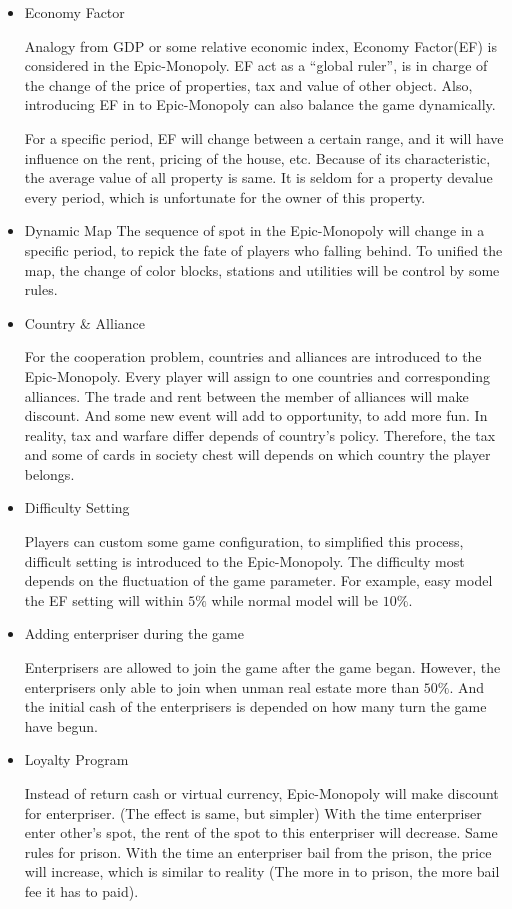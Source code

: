 \documentclass[a4paper,12pt]{article}
\begin{document}
\begin{itemize}
	\item Economy Factor
	
	Analogy from GDP or some relative economic index, Economy Factor(EF) is considered in the Epic-Monopoly. EF act as a “global ruler”, is in charge of the change of the price of properties, tax and value of other object. Also, introducing EF in to Epic-Monopoly can also balance the game dynamically.
	
	For a specific period, EF will change between a certain range, and it will have influence on the rent, pricing of the house, etc. Because of its characteristic, the average value of all property is same. It is seldom for a property devalue every period, which is unfortunate for the owner of this property.
	
	\item Dynamic Map
	The sequence of spot in the Epic-Monopoly will change in a specific period, to repick the fate of players who falling behind. To unified the map, the change of color blocks, stations and utilities will be control by some rules.
	
	\item Country \& Alliance
	
	For the cooperation problem, countries and alliances are introduced to the Epic-Monopoly. Every player will assign to one countries and corresponding alliances. The trade and rent between the member of alliances will make discount. And some new event will add to opportunity, to add more fun. In reality, tax and warfare differ depends of country’s policy. Therefore, the tax and some of cards in society chest will depends on which country the player belongs.
	
	\item Difficulty Setting
	
	Players can custom some game configuration, to simplified this process, difficult setting is introduced to the Epic-Monopoly. The difficulty most depends on the fluctuation of the game parameter. For example, easy model the EF setting will within $5\%$ while normal model will be $10\%$. 
	
	\item Adding enterpriser during the game
	
	Enterprisers are allowed to join the game after the game began. However, the enterprisers only able to join when unman real estate more than $50\%$. And the initial cash of the enterprisers is depended on how many turn the game have begun.
	
	\item Loyalty Program
	
	Instead of return cash or virtual currency, Epic-Monopoly will make discount for enterpriser. (The effect is same, but simpler) With the time enterpriser enter other’s spot, the rent of the spot to this enterpriser will decrease.  Same rules for prison. With the time an enterpriser bail from the prison, the price will increase, which is similar to reality (The more in to prison, the more bail fee it has to paid).
\end{itemize}	
\end{document}
